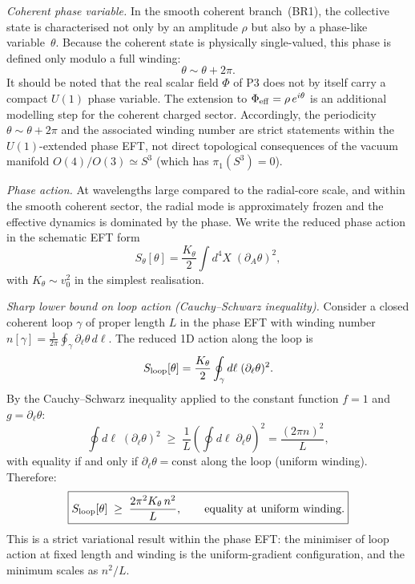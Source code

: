 \documentclass[11pt,a4paper]{article}
\numberwithin{equation}{section}
\begin{document}
\emph{Coherent phase variable.}
In the smooth coherent branch~(BR1), the collective state is
characterised not only by an amplitude $\rho$ but also by a
phase-like variable~$\theta$.
Because the coherent state is physically single-valued, this phase
is defined only modulo a full winding:
\begin{equation}
  \theta \sim \theta + 2\pi.
  \label{eq:theta_periodicity}
\end{equation}
It should be noted that the real scalar field $\Phi$ of P3 does not
by itself carry a compact $U(1)$ phase variable.
The extension to $\Phi_{\rm eff}=\rho\,e^{i\theta}$ is an additional
modelling step for the coherent charged sector.
Accordingly, the periodicity $\theta\sim\theta+2\pi$ and the
associated winding number are strict statements within the
$U(1)$-extended phase EFT, not direct topological consequences of
the vacuum manifold $O(4)/O(3)\simeq S^3$
(which has $\pi_1(S^3)=0$).

\emph{Phase action.}
At wavelengths large compared to the radial-core scale, and within
the smooth coherent sector, the radial mode is approximately frozen
and the effective dynamics is dominated by the phase.
We write the reduced phase action in the schematic EFT form
\begin{equation}
  S_\theta[\theta]
  = \frac{K_\theta}{2}
    \int d^4X\;(\partial_A\theta)^2,
  \label{eq:S_theta_layer1}
\end{equation}
with $K_\theta\sim v_0^2$ in the simplest realisation.

\emph{Sharp lower bound on loop action
(Cauchy--Schwarz inequality).}
Consider a closed coherent loop $\gamma$ of proper length $L$
in the phase EFT with winding number
$n[\gamma]=\frac{1}{2\pi}\oint_\gamma\partial_\ell\theta\,d\ell$.
The reduced 1D action along the loop is
\begin{equation}
  S_{\rm loop}[\theta]
  = \frac{K_\theta}{2}\oint_\gamma d\ell\;
    (\partial_\ell\theta)^2.
  \label{eq:S_loop_def}
\end{equation}
By the Cauchy--Schwarz inequality applied to the constant function
$f=1$ and $g=\partial_\ell\theta$:
\begin{equation}
  \oint d\ell\;(\partial_\ell\theta)^2
  \;\geq\;
  \frac{1}{L}\left(\oint d\ell\;\partial_\ell\theta\right)^{\!2}
  = \frac{(2\pi n)^2}{L},
  \label{eq:CS_inequality}
\end{equation}
with equality if and only if $\partial_\ell\theta=\text{const}$
along the loop (uniform winding).
Therefore:
\begin{equation}
  \boxed{S_{\rm loop}[\theta]
  \;\geq\;
  \frac{2\pi^2 K_\theta\,n^2}{L},
  \qquad
  \text{equality at uniform winding.}}
  \label{eq:loop_bound}
\end{equation}
This is a strict variational result within the phase EFT:
the minimiser of loop action at fixed length and winding is the
uniform-gradient configuration, and the minimum scales as
$n^2/L$.
\end{document}
